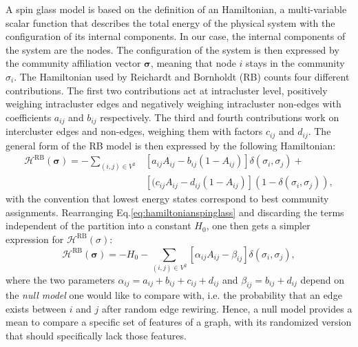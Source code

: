 A spin glass model is based on the definition of an Hamiltonian, a multi-variable scalar function that describes the total energy of the physical system with the configuration of its internal components.
In our case, the internal components of the system are the nodes. The configuration of the system is then expressed by the community affiliation vector $\boldsymbol\sigma$, meaning that node $i$ stays in the community $\sigma_i$.
The Hamiltonian used by Reichardt and Bornholdt (RB) counts four different contributions. The first two contributions act at intracluster level, positively weighing intracluster edges and negatively weighing intracluster non-edges with coefficients $a_{ij}$ and $b_{ij}$ respectively. The third and fourth contributions work on intercluster edges and non-edges, weighing them with factors $c_{ij}$ and $d_{ij}$. The general form of the RB model is then expressed by the following Hamiltonian:
\begin{align}\label{eq:hamiltonianspinglass}
\mathcal{H}^{\textrm{RB}}(\boldsymbol \sigma) = - \sum_{(i,j)\in V^2} & \left[ a_{ij} A_{ij} - b_{ij}(1-A_{ij}) \right] \delta(\sigma_i,\sigma_j) + \nonumber \\ &  \left[ (c_{ij} A_{ij} - d_{ij}(1-A_{ij}) \right] (1-\delta(\sigma_i,\sigma_j)),
\end{align}
with the convention that lowest energy states correspond to best community assignments.
Rearranging Eq.\ref{eq:hamiltonianspinglass} and discarding the terms independent of the partition into a constant $H_0$, one then gets a simpler expression for $\mathcal{H}^{\textrm{RB}}(\sigma)$:
\begin{equation}\label{eq:rbspinglass}
\mathcal{H}^{\textrm{RB}}(\boldsymbol \sigma) = -H_0 - \sum \limits_{(i,j)\in V^2} \left[ \alpha_{ij} A_{ij} - \beta_{ij} \right] \delta(\sigma_i,\sigma_j),
\end{equation}
where the two parameters $\alpha_{ij}=a_{ij}+b_{ij}+c_{ij}+d_{ij}$ and $\beta_{ij}=b_{ij}+d_{ij}$ depend on the \emph{null model} one would like to compare with, i.e. the probability that an edge exists between $i$ and $j$ after random edge rewiring. Hence, a null model provides a mean to compare a specific set of features of a graph, with its randomized version that should specifically lack those features.

